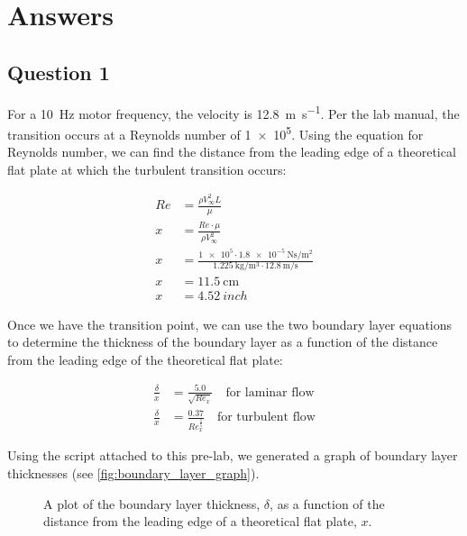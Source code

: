 \chapter{Answers}
\label{cp:answers}
\section{Question 1}

For a \qty{10}{\hertz} motor frequency, the velocity is \qty{12.8}{\meter\per\second}. Per the lab manual, the transition occurs at a Reynolds number of \num{1e5}. Using the equation for Reynolds number, we can find the distance from the leading edge of a theoretical flat plate at which the turbulent transition occurs:

\begin{align}
    Re &= \frac{\rho V_\infty^2 L}{\mu} \\
    x &= \frac{Re\cdot\mu}{\rho V_\infty^2} \nonumber \\
    x &= \frac{\num{1e5}\cdot\qty{1.8e-5}{\newton\second\per\meter\squared}}{\qty{1.225}{\kilo\gram\per\meter\cubed}\cdot\qty{12.8}{\meter\per\second}} \nonumber \\
    x &= \qty{11.5}{\centi\meter} \nonumber \\
    x &= \qty{4.52}{inch} \nonumber
\end{align}

Once we have the transition point, we can use the two boundary layer equations to determine the thickness of the boundary layer as a function of the distance from the leading edge of the theoretical flat plate:

\begin{align}
    \frac{\delta}{x} &= \frac{5.0}{\sqrt{Re_x}}\quad\text{for laminar flow} \\
    \frac{\delta}{x} &= \frac{0.37}{Re_x^{\frac{1}{5}}}\quad\text{for turbulent flow}
\end{align}

Using the script attached to this pre-lab, we generated a graph of boundary layer thicknesses (see \autoref{fig:boundary_layer_graph}).

\begin{figure}[htpb]
    \centering
    
    \caption[A plot of the boundary layer thickness as a function of the distance from the leading edge of a theoretical flat plate.]{A plot of the boundary layer thickness, $\delta$, as a function of the distance from the leading edge of a theoretical flat plate, $x$.}
    \label{fig:boundary_layer_graph}
\end{figure}

